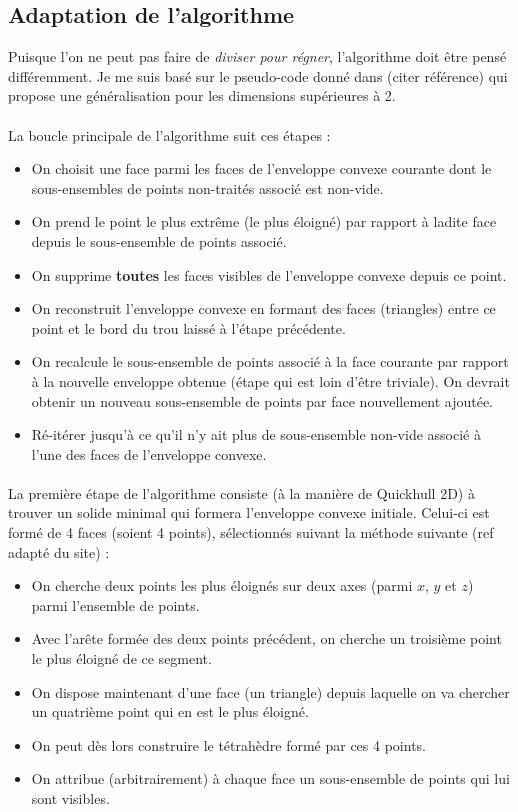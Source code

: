 \documentclass[]{article}
\begin{document}
\subsection{Adaptation de l'algorithme}

Puisque l'on ne peut pas faire de \emph{diviser pour régner}, l'algorithme doit être pensé différemment. Je me suis basé sur le pseudo-code donné dans (citer référence) qui propose une généralisation pour les dimensions supérieures à 2.

\paragraph{}
La boucle principale de l'algorithme suit ces étapes :
\begin{itemize}
	\item On choisit une face parmi les faces de l'enveloppe convexe courante dont le sous-ensembles de points non-traités associé est non-vide.
	\item On prend le point le plus extrême (le plus éloigné) par rapport à ladite face depuis le sous-ensemble de points associé.
	\item On supprime \textbf{toutes} les faces visibles de l'enveloppe convexe depuis ce point.
	\item On reconstruit l'enveloppe convexe en formant des faces (triangles) entre ce point et le bord du trou laissé à l'étape précédente.
	\item On recalcule le sous-ensemble de points associé à la face courante par rapport à la nouvelle enveloppe obtenue (étape qui est loin d'être triviale). On devrait obtenir un nouveau sous-ensemble de points par face nouvellement ajoutée.
	\item Ré-itérer jusqu'à ce qu'il n'y ait plus de sous-ensemble non-vide associé à l'une des faces de l'enveloppe convexe.
\end{itemize}

\paragraph{}
La première étape de l'algorithme consiste (à la manière de Quickhull 2D) à trouver un solide minimal qui formera l'enveloppe convexe initiale. Celui-ci est formé de 4 faces (soient 4 points), sélectionnés suivant la méthode suivante (ref adapté du site) :
\begin{itemize}
	\item On cherche deux points les plus éloignés sur deux axes (parmi $x$, $y$ et $z$) parmi l'ensemble de points.
	\item Avec l'arête formée des deux points précédent, on cherche un troisième point le plus éloigné de ce segment.
	\item On dispose maintenant d'une face (un triangle) depuis laquelle on va chercher un quatrième point qui en est le plus éloigné.
	\item On peut dès lors construire le tétrahèdre formé par ces 4 points.
	\item On attribue (arbitrairement) à chaque face un sous-ensemble de points qui lui sont visibles.
\end{itemize}
\end{document}
